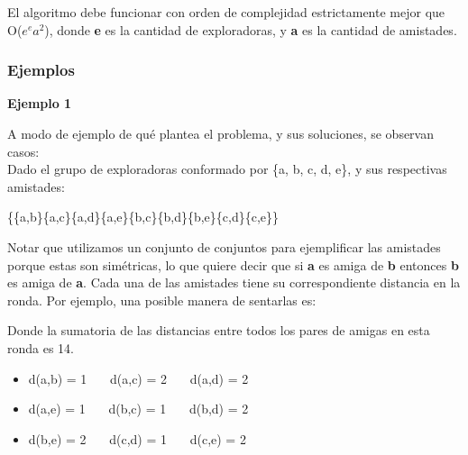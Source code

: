 \documentclass[spanish,a4paper]{article}
\begin{document}
El algoritmo debe funcionar con orden de complejidad estrictamente mejor que O($e^{e}  a^{2}$), donde \textbf{e} es la cantidad de exploradoras, y \textbf{a} es la cantidad de amistades.

\subsubsection{Ejemplos}

\vspace{2mm}
\textbf{Ejemplo 1}
\vspace{2mm}

A modo de ejemplo de qué plantea el problema, y sus soluciones, se observan casos:\\ 

Dado el grupo de exploradoras conformado por \{a, b, c, d, e\}, y sus respectivas amistades: 

\begin{center}
\{\{a,b\}\{a,c\}\{a,d\}\{a,e\}\{b,c\}\{b,d\}\{b,e\}\{c,d\}\{c,e\}\}
\end{center}

Notar que utilizamos un conjunto de conjuntos para ejemplificar las amistades porque estas son simétricas, lo que quiere
decir que si \textbf{a} es amiga de \textbf{b} entonces \textbf{b} es amiga de \textbf{a}. Cada una de las
amistades tiene su correspondiente distancia en la ronda. Por ejemplo, una posible manera de sentarlas es:

\begin{figure}[H]
\begin{center}
\end{center}
\end{figure}

Donde la sumatoria de las distancias entre todos los pares de amigas en esta ronda es 14.
\begin{itemize}
  \item d(a,b) = 1   \ \ \ \inlineitem d(a,c) = 2 \ \ \ \inlineitem d(a,d) = 2
  \item d(a,e) = 1   \ \ \ \inlineitem d(b,c) = 1 \ \ \ \inlineitem d(b,d) = 2
  \item d(b,e) = 2   \ \ \ \inlineitem d(c,d) = 1 \ \ \ \inlineitem d(c,e) = 2
\end{itemize}
\end{document}

